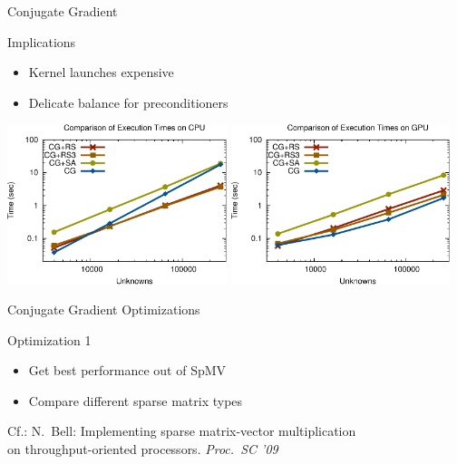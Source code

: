 \begin{frame}[fragile]{Conjugate Gradient}

 \begin{block}{Implications}
   \begin{itemize}
   \item Kernel launches expensive
   \item Delicate balance for preconditioners
  \end{itemize}
  
      \vspace*{.8cm}
  \begin{center}
   \includegraphics[width=0.48\textwidth]{figures/cpu_scaling-2} \hfill
   \includegraphics[width=0.48\textwidth]{figures/gpu_scaling-2}
  \end{center}
      \vspace*{.8cm}  
 \end{block}
   
\end{frame}



\begin{frame}[fragile]{Conjugate Gradient Optimizations}

 \vspace*{2cm}
 \begin{block}{Optimization 1}
   \begin{itemize}
   \item Get best performance out of SpMV
   \item Compare different sparse matrix types
  \end{itemize}
 \end{block}

 \vspace*{2cm}
    {\small Cf.: N.~Bell: Implementing sparse matrix-vector multiplication\\ on throughput-oriented processors. \textit{Proc.~SC '09}}


\end{frame}


